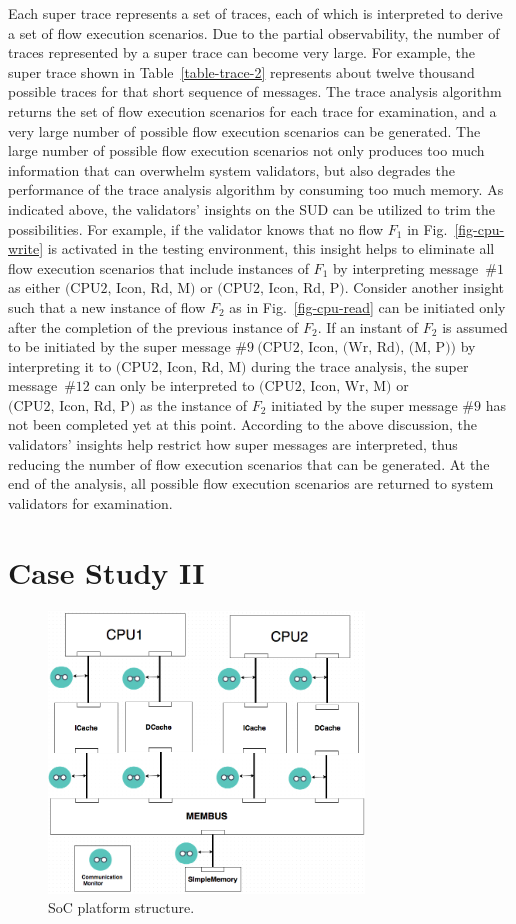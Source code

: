 \documentclass[conference]{IEEEtran}
\begin{document}
Each super trace represents a set of traces, each of which is interpreted to derive a set of flow execution scenarios.
Due to the partial observability, the number of traces represented by a super trace can become very large. For example, the super trace shown in Table~\ref{table-trace-2} represents about twelve thousand possible traces for that short sequence of messages.  The trace analysis algorithm returns the set of flow execution scenarios for each trace for examination, and a very large number of possible flow execution scenarios can be generated.  The large number of possible flow execution scenarios not only produces too much information that can overwhelm system validators, but also degrades the performance of the trace analysis algorithm by consuming too much memory.  As indicated above,  the validators' insights on the SUD can be utilized to trim the possibilities.  For example, if the validator knows that no flow $F_1$ in Fig.~\ref{fig-cpu-write} is activated in the testing environment, this insight helps to eliminate all flow execution scenarios that include instances of $F_1$ by interpreting message~$\#1$ as either $\mbox{(CPU2, Icon, Rd, M)}$ or $\mbox{(CPU2, Icon, Rd, P)}$.  Consider another insight such that a new instance of flow $F_2$ as in Fig.~\ref{fig-cpu-read} can be initiated only after the completion of the previous instance of $F_2$.  If an instant of $F_2$ is assumed to be initiated by the super message $\#9~\mbox{(CPU2, Icon, (Wr, Rd), (M, P))}$ by interpreting it to $\mbox{(CPU2, Icon, Rd, M)}$ during the trace analysis, the super message~$\#12$ can only be interpreted to $\mbox{(CPU2, Icon, Wr, M)}$ or $\mbox{(CPU2, Icon, Rd, P)}$ as the instance of $F_2$ initiated by the super message $\#9$ has not been completed yet at this point.   According to the above discussion, the validators' insights help restrict how super messages are interpreted, thus reducing the number of flow execution scenarios that can be generated.
At the end of the analysis, all possible flow execution scenarios are returned to system validators for examination. 


%
%
\section{Case Study II}

\begin{figure} 
\centerline{
\includegraphics[width=3.3in]{figures/Fig4.png}}
\caption{SoC platform structure.}
\label{SoC}
\end{figure}
\end{document}
